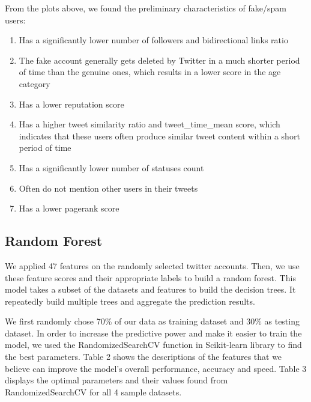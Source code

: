 \documentclass[a4paper, 12pt]{report}
\begin{document}
\noindent From the plots above, we found the preliminary characteristics of fake/spam users:
\begin{enumerate}
	\item Has a significantly lower number of followers and bidirectional links ratio
	\item The fake account generally gets deleted by Twitter in a much shorter period of time than the genuine ones, which results in a lower score in the age category
	\item Has a lower reputation score
	\item Has a higher tweet similarity ratio and tweet\_time\_mean score, which indicates that these users often produce similar tweet content within a short period of time
	\item Has a significantly lower number of statuses count
	\item Often do not mention other users in their tweets
	\item Has a lower pagerank score
\end{enumerate}

\subsection*{Random Forest}
We applied 47 features on the randomly selected twitter accounts. Then, we use these feature scores and their appropriate labels to build a random forest. This model takes a subset of the datasets and features to build the decision trees. It repeatedly build multiple trees and aggregate the prediction results. \par

\noindent We first randomly chose 70\% of our data as training dataset and 30\% as testing dataset. In order to increase the predictive power and make it easier to train the model, we used the RandomizedSearchCV function in Scikit-learn library to find the best parameters. Table 2 shows the descriptions of the features that we believe can improve the model's overall performance, accuracy and speed. Table 3 displays the optimal parameters and their values found from RandomizedSearchCV for all 4 sample datasets.
\end{document}
